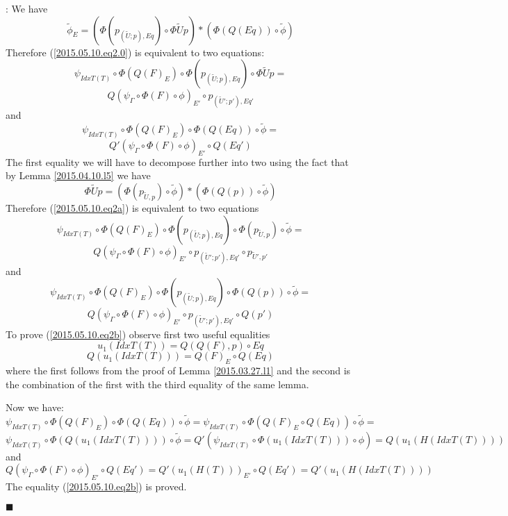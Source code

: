 \documentclass[12pt]{article}
\numberwithin{equation}{section}
\newenvironment{eq}{\begin{equation}}{\end{equation}}
\newenvironment{myproof}{{\bf Proof}:}{$\blacksquare$ \vskip 5mm }
\newcommand{\llabel}[1]{\label{#1}}
\newcommand{\wt}{\widetilde}
\begin{document}
\begin{myproof}
We have
%
$$\wt{\phi}_E=(\Phi(p_{(\wt{U};p),Eq})\circ
\Phi\wt{U}p)*(\Phi(Q(Eq))\circ\wt{\phi})$$
%
Therefore (\ref{2015.05.10.eq2.0}) is equivalent to two equations:
%
$$\psi_{IdxT(T)}\circ \Phi(Q(F)_E)\circ \Phi(p_{(\wt{U};p),Eq})\circ
\Phi\wt{U}p=$$
\begin{eq}
\label{2015.05.10.eq2a}
Q(\psi_{\Gamma}\circ \Phi(F)\circ \phi)_{E'}\circ p_{(\wt{U}';p'),Eq'}
\end{eq}
%
and
%
$$\psi_{IdxT(T)}\circ \Phi(Q(F)_E)\circ \Phi(Q(Eq))\circ\wt{\phi}=$$
\begin{eq}
\label{2015.05.10.eq2b}
Q'(\psi_{\Gamma}\circ \Phi(F)\circ \phi)_{E'}\circ Q(Eq')
\end{eq}
%
The first equality we will have to decompose further into two using the fact
that by Lemma \ref{2015.04.10.l5} we have
%
$$\Phi\wt{U}p=(\Phi(p_{\wt{U},p})\circ\wt{\phi})*(\Phi(Q(p))\circ \wt{\phi})$$
%
Therefore (\ref{2015.05.10.eq2a}) is equivalent to two equations
%
$$\psi_{IdxT(T)}\circ \Phi(Q(F)_E)\circ \Phi(p_{(\wt{U};p),Eq})\circ
\Phi(p_{\wt{U},p})\circ\wt{\phi}=$$
\begin{eq}
\llabel{2015.05.10.eq2aa} Q(\psi_{\Gamma}\circ \Phi(F)\circ \phi)_{E'}\circ
p_{(\wt{U}';p'),Eq'}\circ p_{\wt{U}',p'}
\end{eq}
%
and
%
$$\psi_{IdxT(T)}\circ \Phi(Q(F)_E)\circ \Phi(p_{(\wt{U};p),Eq})\circ
\Phi(Q(p))\circ\wt{\phi}=$$
\begin{eq}
\llabel{2015.05.10.eq2ab} Q(\psi_{\Gamma}\circ \Phi(F)\circ \phi)_{E'}\circ
p_{(\wt{U}';p'),Eq'}\circ Q(p')
\end{eq}
%
To prove (\ref{2015.05.10.eq2b}) observe first two useful equalities
%
$$u_1(IdxT(T))=Q(Q(F),p)\circ Eq$$
%
$$Q(u_1(IdxT(T)))=Q(F)_{E}\circ Q(Eq)$$
%
where the first follows from the proof of Lemma \ref{2015.03.27.l1} and the
second is the combination of the first with the third equality of the same
lemma.

Now we have:
%
$$\psi_{IdxT(T)}\circ \Phi(Q(F)_E)\circ
\Phi(Q(Eq))\circ\wt{\phi}=\psi_{IdxT(T)}\circ \Phi(Q(F)_E\circ
Q(Eq))\circ\wt{\phi}=$$
$$\psi_{IdxT(T)}\circ \Phi(Q(u_1(IdxT(T))))\circ
\wt{\phi}=Q'(\psi_{IdxT(T)}\circ \Phi(u_1(IdxT(T)))\circ
\phi)=Q(u_1(H(IdxT(T))))$$
%
and
%
$$Q(\psi_{\Gamma}\circ \Phi(F)\circ \phi)_{E'}\circ
Q(Eq')=Q'(u_1(H(T)))_{E'}\circ Q(Eq')=Q'(u_1(H(IdxT(T))))$$
%
The equality (\ref{2015.05.10.eq2b}) is proved.


\end{myproof}
\end{document}
